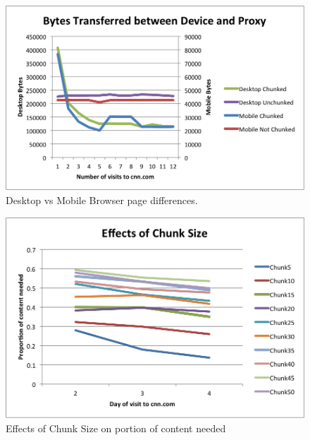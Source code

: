 \begin{figure}[h] 
\centering \includegraphics[width=\columnwidth]{images/desktopmobile.png}
\caption{Desktop vs Mobile Browser page differences.}
\end{figure}

\begin{figure}[h] 
\centering \includegraphics[width=\columnwidth]{images/chunksize.png}
\caption{Effects of Chunk Size on portion of content needed}
\end{figure}

